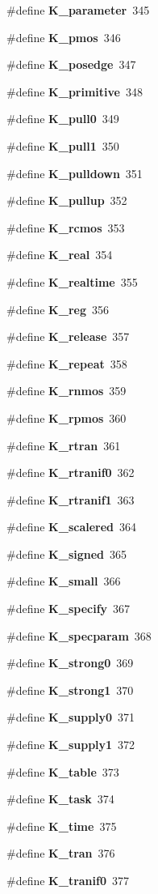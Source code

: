 \begin{CompactItemize}
\#define {\bf K\_\-parameter}\ 345
\item 
\#define {\bf K\_\-pmos}\ 346
\item 
\#define {\bf K\_\-posedge}\ 347
\item 
\#define {\bf K\_\-primitive}\ 348
\item 
\#define {\bf K\_\-pull0}\ 349
\item 
\#define {\bf K\_\-pull1}\ 350
\item 
\#define {\bf K\_\-pulldown}\ 351
\item 
\#define {\bf K\_\-pullup}\ 352
\item 
\#define {\bf K\_\-rcmos}\ 353
\item 
\#define {\bf K\_\-real}\ 354
\item 
\#define {\bf K\_\-realtime}\ 355
\item 
\#define {\bf K\_\-reg}\ 356
\item 
\#define {\bf K\_\-release}\ 357
\item 
\#define {\bf K\_\-repeat}\ 358
\item 
\#define {\bf K\_\-rnmos}\ 359
\item 
\#define {\bf K\_\-rpmos}\ 360
\item 
\#define {\bf K\_\-rtran}\ 361
\item 
\#define {\bf K\_\-rtranif0}\ 362
\item 
\#define {\bf K\_\-rtranif1}\ 363
\item 
\#define {\bf K\_\-scalered}\ 364
\item 
\#define {\bf K\_\-signed}\ 365
\item 
\#define {\bf K\_\-small}\ 366
\item 
\#define {\bf K\_\-specify}\ 367
\item 
\#define {\bf K\_\-specparam}\ 368
\item 
\#define {\bf K\_\-strong0}\ 369
\item 
\#define {\bf K\_\-strong1}\ 370
\item 
\#define {\bf K\_\-supply0}\ 371
\item 
\#define {\bf K\_\-supply1}\ 372
\item 
\#define {\bf K\_\-table}\ 373
\item 
\#define {\bf K\_\-task}\ 374
\item 
\#define {\bf K\_\-time}\ 375
\item 
\#define {\bf K\_\-tran}\ 376
\item 
\#define {\bf K\_\-tranif0}\ 377
\item 

\end{CompactItemize}
